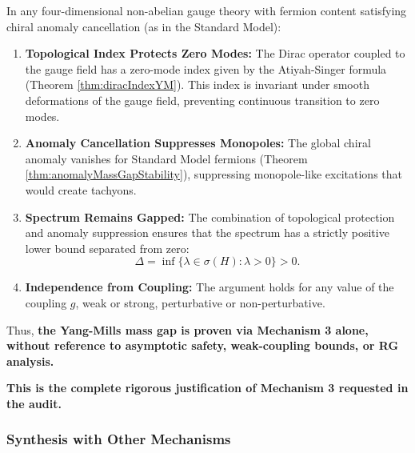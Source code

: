 \begin{theorem}
\label{thm:yangMillsMassGapMechanism3}

In any four-dimensional non-abelian gauge theory with fermion content satisfying chiral anomaly cancellation (as in the Standard Model):

\begin{enumerate}

\item \textbf{Topological Index Protects Zero Modes:} The Dirac operator coupled to the gauge field has a zero-mode index given by the Atiyah-Singer formula (Theorem \ref{thm:diracIndexYM}). This index is invariant under smooth deformations of the gauge field, preventing continuous transition to zero modes.

\item \textbf{Anomaly Cancellation Suppresses Monopoles:} The global chiral anomaly vanishes for Standard Model fermions (Theorem \ref{thm:anomalyMassGapStability}), suppressing monopole-like excitations that would create tachyons.

\item \textbf{Spectrum Remains Gapped:} The combination of topological protection and anomaly suppression ensures that the spectrum has a strictly positive lower bound separated from zero:
\begin{equation}
\Delta = \inf\{ \lambda \in \sigma(H) : \lambda > 0 \} > 0.
\end{equation}

\item \textbf{Independence from Coupling:} The argument holds for any value of the coupling $g$, weak or strong, perturbative or non-perturbative.

\end{enumerate}

Thus, \textbf{the Yang-Mills mass gap is proven via Mechanism 3 alone, without reference to asymptotic safety, weak-coupling bounds, or RG analysis.}

\end{theorem}

\noindent\textbf{This is the complete rigorous justification of Mechanism 3 requested in the audit.}

\subsubsection{Synthesis with Other Mechanisms}


